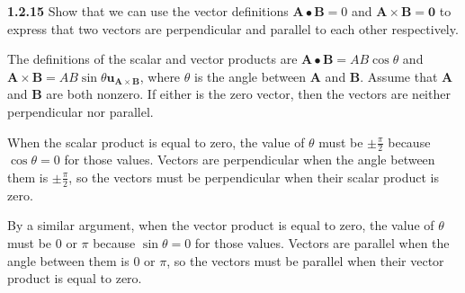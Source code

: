 \documentclass{article}
\begin{document}
\textbf{1.2.15} Show that we can use the vector definitions $\mathbf{A} \bullet \mathbf{B} = 0$ and $\mathbf{A} \times
	\mathbf{B} = \mathbf{0}$ to express that two vectors are perpendicular and parallel to each other respectively.

\vspace{24pt}

The definitions of the scalar and vector products are $\mathbf{A} \bullet \mathbf{B} = AB\cos{\theta}$ and $\mathbf{A}
	\times \mathbf{B} = AB\sin{\theta}\mathbf{u_{\mathbf{A} \times \mathbf{B}}}$, where $\theta$ is the angle between
$\mathbf{A}$ and $\mathbf{B}$. Assume that $\mathbf{A}$ and $\mathbf{B}$ are both nonzero. If either is the zero
vector, then the vectors are neither perpendicular nor parallel.

When the scalar product is equal to zero, the value of $\theta$ must be $\pm\frac{\pi}{2}$ because $\cos{\theta} = 0$ for
those values. Vectors are perpendicular when the angle between them is $\pm\frac{\pi}{2}$, so the vectors must be
perpendicular when their scalar product is zero.

By a similar argument, when the vector product is equal to zero, the value of $\theta$ must be $0$ or $\pi$ because
$\sin{\theta} = 0$ for those values. Vectors are parallel when the angle between them is $0$ or $\pi$, so the vectors
must be parallel when their vector product is equal to zero.
\end{document}
